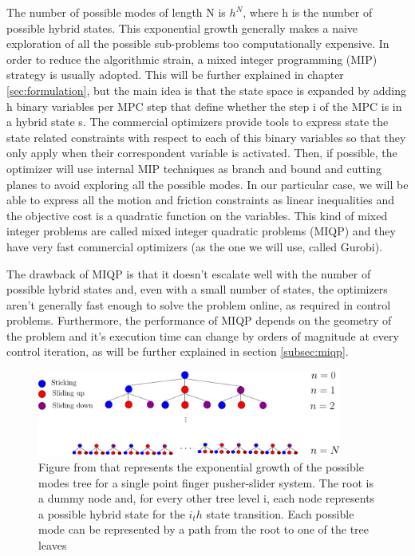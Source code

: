 \documentclass[12,twoside]{TFG-GM}
\theoremstyle{definition}
\theoremstyle{remark}
\begin{document}
The number of possible modes of length N is $h^N$, where h is the number of possible hybrid states. This exponential growth generally makes a naive exploration of all the possible sub-problems too computationally expensive. In order to reduce the algorithmic strain, a mixed integer programming (MIP) strategy is usually adopted. This will be further explained in chapter \ref{sec:formulation}, but the main idea is that the state space is expanded by adding h binary variables per MPC step that define whether the step i of the MPC is in a hybrid state s. The commercial optimizers provide tools to express state the state related constraints with respect to each of this binary variables so that they only apply when their correspondent variable is activated. Then, if possible, the optimizer will use internal MIP techniques as branch and bound and cutting planes \cite{gurobi_mip} to avoid exploring all the possible modes. In our particular case, we will be able to express all the motion and friction constraints as linear inequalities and the objective cost is a quadratic function on the variables. This kind of mixed integer problems are called mixed integer quadratic problems (MIQP) and they have very fast commercial optimizers (as the one we will use, called Gurobi). 

The drawback of MIQP is that it doesn't escalate well with the number of possible hybrid states and, even with a small number of states, the optimizers aren't generally fast enough to solve the problem online, as required in control problems. Furthermore, the performance of MIQP depends on the geometry of the problem and it's execution time can change by orders of magnitude at every control iteration, as will be further explained in section \ref{subsec:miqp}.

\begin{figure}[htb!]
\begin{center}
\includegraphics[width=10cm]{MPC_Tree-eps-converted-to.pdf}
\end{center}
\caption[test caption]{\label{fig:mode_tree} \small{Figure from \protect\cite{fom} that represents the exponential growth of the possible modes tree for a single point finger pusher-slider system. The root is a dummy node and, for every other tree level i, each node represents a possible hybrid state for the $i_th$ state transition. Each possible mode can be represented by a path from the root to one of the tree leaves}}
\end{figure}
\end{document}

